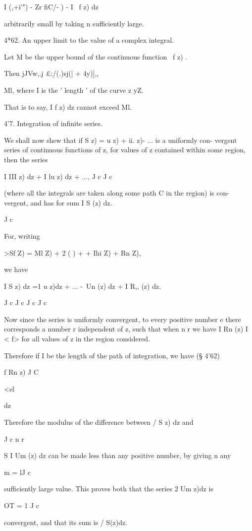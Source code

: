 I (,+i'") - Zr fiC/- ) - I \ f z) dz

arbitrarily small by taking n sufficiently large.

4*62. An upper limit to the value of a complex integral.

Let M be the upper bound of the continuous function \ f z) .

Then jJVw,.j £:/(.)sj(| + 4y)],,

 Ml, where I is the ' length ' of the curve z yZ.

That is to say, I f z) dz cannot exceed Ml.

4'7. Integration of infinite series.

We shall now shew that if S z) = u z) + ii. z)- ... is a uniformly
con- vergent series of continuous functions of z, for values of z
contained within some region, then the series

I III z) dz + I lu z) dz + ..., J c J c

(where all the integrals are taken along some path C in the region) is
con- vergent, and has for sum I S (z) dz.

J c

%
%

For, writing

>Sf Z) = Ml Z) + 2 ( ) +    + Ihi Z) + Rn Z),

we have

I S z) dz =1 u z)dz + ... -\ Un (z) dz + I R,, (z) dz.

J c J c J c J c

Now since the series is uniformly convergent, to every positive number
e there corresponds a number r independent of z, such that when n r we
have I Rn (z) I < f> for all values of z in the region considered.

Therefore if I be the length of the path of integration, we have (§
4'62)

f Rn z) J C

<el

dz

Therefore the modulus of the difference between / S z) dz and

J c n r

S I Um (z) dz can be made less than any positive number, by giving n
any

m = lJ c

sufficiently large value. This proves both that the series 2 Um z)dz
is

OT = 1 J c

convergent, and that its sum is / S(z)dz.

